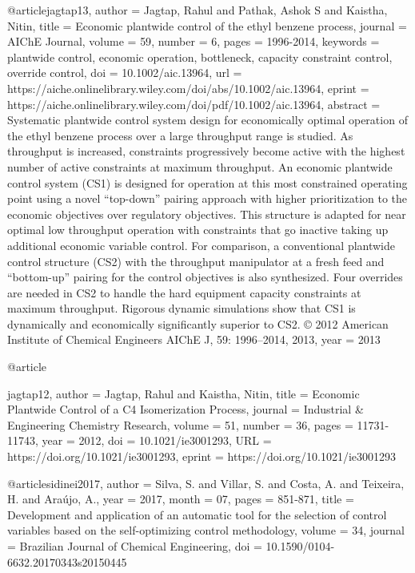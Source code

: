 @article{jagtap13,
author = {Jagtap, Rahul and Pathak, Ashok S and Kaistha, Nitin},
title = {Economic plantwide control of the ethyl benzene process},
journal = {AIChE Journal},
volume = {59},
number = {6},
pages = {1996-2014},
keywords = {plantwide control, economic operation, bottleneck, capacity constraint control, override control},
doi = {10.1002/aic.13964},
url = {https://aiche.onlinelibrary.wiley.com/doi/abs/10.1002/aic.13964},
eprint = {https://aiche.onlinelibrary.wiley.com/doi/pdf/10.1002/aic.13964},
abstract = {Systematic plantwide control system design for economically optimal operation of the ethyl benzene process over a large throughput range is studied. As throughput is increased, constraints progressively become active with the highest number of active constraints at maximum throughput. An economic plantwide control system (CS1) is designed for operation at this most constrained operating point using a novel “top-down” pairing approach with higher prioritization to the economic objectives over regulatory objectives. This structure is adapted for near optimal low throughput operation with constraints that go inactive taking up additional economic variable control. For comparison, a conventional plantwide control structure (CS2) with the throughput manipulator at a fresh feed and “bottom-up” pairing for the control objectives is also synthesized. Four overrides are needed in CS2 to handle the hard equipment capacity constraints at maximum throughput. Rigorous dynamic simulations show that CS1 is dynamically and economically significantly superior to CS2. © 2012 American Institute of Chemical Engineers AIChE J, 59: 1996–2014, 2013},
year = {2013}
}

@article{jagtap12,
author = {Jagtap, Rahul and Kaistha, Nitin},
title = {Economic Plantwide Control of a C4 Isomerization Process},
journal = {Industrial \& Engineering Chemistry Research},
volume = {51},
number = {36},
pages = {11731-11743},
year = {2012},
doi = {10.1021/ie3001293},
URL = {https://doi.org/10.1021/ie3001293},
eprint = { 
        https://doi.org/10.1021/ie3001293}

}

@article{sidinei2017,
author = {Silva, S. and Villar, S. and Costa, A. and Teixeira, H. and Araújo, A.},
year = {2017},
month = {07},
pages = {851-871},
title = {Development and application of an automatic tool for the selection of control variables based on the self-optimizing control methodology},
volume = {34},
journal = {Brazilian Journal of Chemical Engineering},
doi = {10.1590/0104-6632.20170343s20150445}
}


